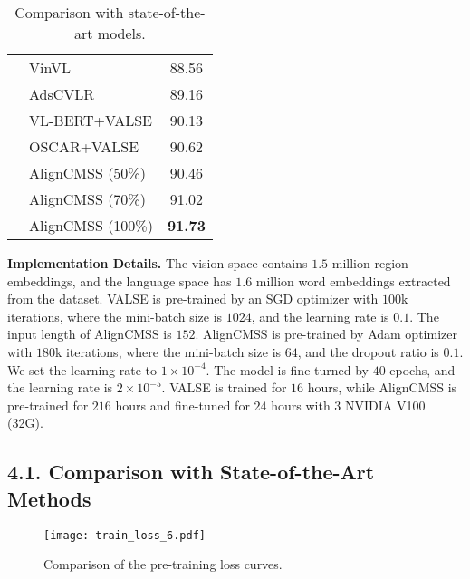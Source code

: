 \documentclass[letterpaper]{article} \usepackage{aaai24}  \usepackage{times}  \usepackage{helvet}  \usepackage{courier}  \usepackage[hyphens]{url}  \usepackage{graphicx} \urlstyle{rm} \def\UrlFont{\rm}  \usepackage{natbib}  \usepackage{caption} \frenchspacing  \setlength{\pdfpagewidth}{8.5in}  \setlength{\pdfpageheight}{11in}
\begin{document}
\begin{table}[t]
{\begin{tabular}{l|l|c}
                                            & VinVL \cite{zhang2021vinvl}     & 88.56 \\
                                            & AdsCVLR \cite{10.1145/3503161.3548226}                  & 89.16 \\ \cline{2-3} 
                                            & VL-BERT+VALSE              & 90.13     \\
                                            & OSCAR+VALSE              & 90.62       \\
                                            & AlignCMSS (50\%)              & 90.46       \\
                                            & AlignCMSS (70\%)             & 91.02       \\
                                            & AlignCMSS (100\%)              & \textbf{91.73} \\ \bottomrule
\end{tabular}}
\caption{Comparison with state-of-the-art models.
}
\vspace{-10pt}
\label{tab:sota}
\end{table}

\noindent\textbf{Implementation Details.}
The vision space contains $1.5$ million region embeddings, and the language space has $1.6$ million word embeddings extracted from the dataset. VALSE is pre-trained by an SGD optimizer with $100$k iterations, where the mini-batch size is $1024$, and the learning rate is $0.1$. The input length of AlignCMSS is $152$. AlignCMSS is pre-trained by Adam optimizer with $180$k iterations, where the mini-batch size is $64$, and the dropout ratio is $0.1$. We set the learning rate to $1 \times 10^{-4}$. The model is fine-turned by $40$ epochs, and the learning rate is $2 \times 10^{-5}$. VALSE is trained for $16$ hours, while AlignCMSS is pre-trained for $216$ hours and fine-tuned for $24$ hours with $3$ NVIDIA V100 (32G). 

\subsection{4.1. Comparison with State-of-the-Art Methods}

 \begin{figure}[t]

    \centering
    \texttt{[image: train\_loss\_6.pdf]}
    \caption{Comparison of the pre-training loss curves.}
    \vspace{-5pt}
    \label{fig:loss}

\end{figure}
\end{document}

